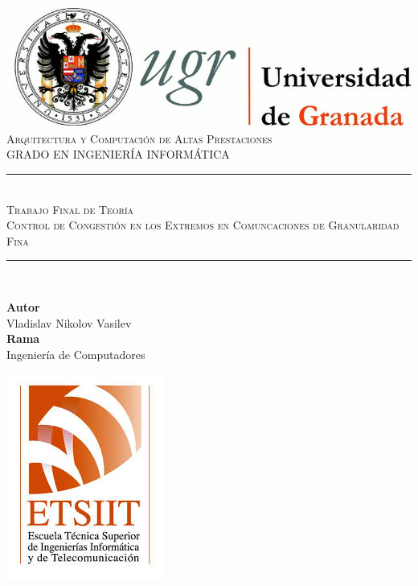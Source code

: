 \documentclass[11pt,a4paper]{article}
\newcommand{\asignatura}{Arquitectura y Computación de Altas Prestaciones}
\newcommand{\autor}{Vladislav Nikolov Vasilev}
\newcommand{\titulo}{Trabajo Final de Teoría}
\newcommand{\subtitulo}{Control de Congestión en los Extremos en Comuncaciones
de Granularidad Fina}
\newcommand{\rama}{Ingeniería de Computadores}
\begin{document}

\begin{titlepage}

\begin{minipage}{\textwidth}

\centering

\includegraphics[scale=0.3]{img/logo_ugr.jpg}\\[1cm]

\textsc{\Large \asignatura{}\\[0.2cm]}
\textsc{GRADO EN INGENIERÍA INFORMÁTICA}\\[1cm]

\noindent\rule[-1ex]{\textwidth}{1pt}\\[1.5ex]
\textsc{{\Huge \titulo\\[0.5ex]}}
\textsc{{\Large \subtitulo\\}}
\noindent\rule[-1ex]{\textwidth}{2pt}\\[3.5ex]

\end{minipage}

\vspace{0.7cm}

\begin{minipage}{\textwidth}

\centering

\textbf{Autor}\\ {\autor{}}\\[2.5ex]
\textbf{Rama}\\ {\rama}\\[2.5ex]
\vspace{0.3cm}

\includegraphics[scale=0.3]{img/etsiit.jpeg}


\end{minipage}
\end{titlepage}
\end{document}
